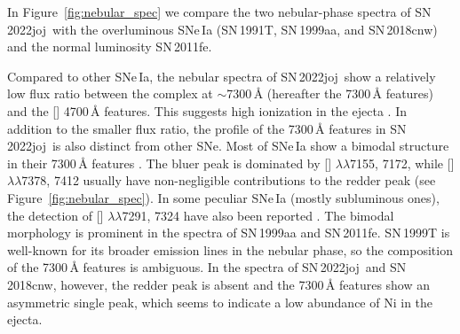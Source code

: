 \documentclass[twocolumn]{aastex631}
\newcommand{\sn}{SN\,2022joj}
\newcommand{\chang}[1]{\textcolor{blue}{[Chang: #1]}}
\begin{document}
\begin{CJK*}{UTF8}{gbsn}
In Figure~\ref{fig:nebular_spec} we compare the two nebular-phase spectra of \sn\ with the overluminous SNe\,Ia (SN\,1991T, SN\,1999aa, and SN\,2018cnw) and the normal luminosity SN\,2011fe.

Compared to other SNe\,Ia, the nebular spectra of \sn\ show a relatively low flux ratio between the complex at $\sim$7300\,\r{A} (hereafter the 7300\,\r{A} features) and the [] 4700\,\r{A} features. This suggests high ionization in the ejecta \citep{Wilk_2020}. In addition to the smaller flux ratio, the profile of the 7300\,\r{A} features in \sn\ is also distinct from other SNe. Most of SNe\,Ia show a bimodal structure in their 7300\,\r{A} features \citep[e.g.,][]{Graham_2017,Maguire_2018}. The bluer peak is dominated by [] $\lambda\lambda$7155, 7172, while [] $\lambda\lambda$7378, 7412 usually have non-negligible contributions to the redder peak (see Figure~\ref{fig:nebular_spec}). In some peculiar SNe\,Ia (mostly subluminous ones), the detection of [] $\lambda\lambda$7291, 7324 have also been reported \citep[e.g.][]{jacobson-galan_16hnk_2020,Siebert_19yvq_2020}. The bimodal morphology is prominent in the spectra of SN\,1999aa and SN\,2011fe. SN\,1999T is well-known for its broader emission lines in the nebular phase, so the composition of the 7300\,\r{A} features is ambiguous. In the spectra of \sn\ and SN\,2018cnw, however, the redder peak is absent and the 7300\,\r{A} features show an asymmetric single peak, which seems to indicate a low abundance of Ni in the ejecta.



\end{CJK*}
\end{document}
